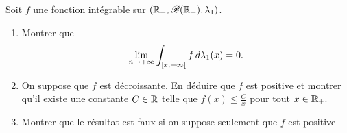 \begin{td-exo}[] %
    Soit \(f\) une fonction intégrable sur \( \left({\mathbb{R}}_+,\mathscr{B} ({\mathbb{R}}_+),\lambda_1\right) \).
    \begin{enumerate}
        \item Montrer que
        \begin{equation*}
            \lim_{n\to+\infty}\int_{\mathopen{}\left[x,+\infty\right[\mathclose{}} f\mathop{}\!{d}\lambda_1(x)=0.
        \end{equation*}
        \item On suppose que \(f\) est décroissante. En déduire que \(f\) est
        positive et montrer qu'il existe une constante \(C\in\mathbb{R}\) telle que
        \(f(x)\leq \frac{C}{x}\) pour tout \(x\in\mathbb{R}_+\).
        
        \item Montrer que le résultat est faux si on suppose seulement que
        \(f\) est positive
    \end{enumerate}
\end{td-exo}
